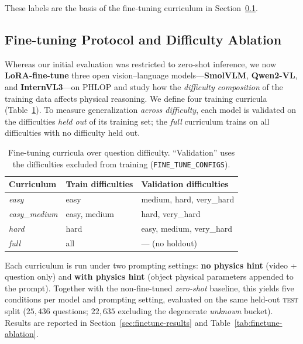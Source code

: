 These labels are the basis of the fine-tuning curriculum in
Section~\ref{sec:finetune}.


\subsection{Fine-tuning Protocol and Difficulty Ablation}
\label{sec:finetune}

Whereas our initial evaluation was restricted to zero-shot inference, we now
\textbf{LoRA-fine-tune} three open vision--language models---\textbf{SmolVLM},
\textbf{Qwen2-VL}, and \textbf{InternVL3}---on PHLOP and study how the
\emph{difficulty composition} of the training data affects physical reasoning.
We define four training curricula (Table~\ref{tab:ftconfig}). To measure
generalization \emph{across difficulty}, each model is validated on the
difficulties \emph{held out} of its training set; the \textit{full} curriculum
trains on all difficulties with no difficulty held out.

\begin{table}[t]
\centering
\caption{Fine-tuning curricula over question difficulty. ``Validation'' uses the
difficulties excluded from training (\texttt{FINE\_TUNE\_CONFIGS}).}
\label{tab:ftconfig}
\small
\begin{tabular}{lll}
\toprule
Curriculum & Train difficulties & Validation difficulties \\
\midrule
\textit{easy}        & easy               & medium, hard, very\_hard \\
\textit{easy\_medium} & easy, medium       & hard, very\_hard \\
\textit{hard}        & hard               & easy, medium, very\_hard \\
\textit{full}        & all                & --- (no holdout) \\
\bottomrule
\end{tabular}
\end{table}

Each curriculum is run under two prompting settings: \textbf{no physics hint}
(video + question only) and \textbf{with physics hint} (object physical
parameters appended to the prompt). Together with the non-fine-tuned
\emph{zero-shot} baseline, this yields five conditions per model and prompting
setting, evaluated on the same held-out \textsc{test} split
($25{,}436$ questions; $22{,}635$ excluding the degenerate \textit{unknown}
bucket). Results are reported in Section~\ref{sec:finetune-results} and
Table~\ref{tab:finetune-ablation}.
